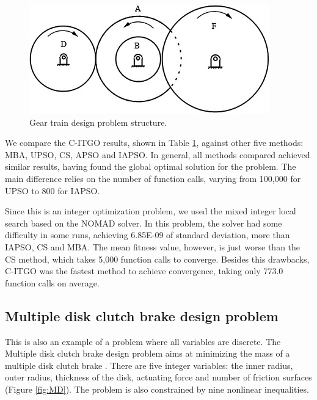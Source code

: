 \begin{figure}[h]
\begin{center}
\includegraphics[scale=0.6]{Imgs/GT.jpg}
\end{center}
\captionsetup{justification=centering}
\caption{Gear train design problem structure.}\label{fig:GT}
\end{figure}


We compare the C-ITGO results, shown in Table \ref{fig:GT}, against other five methods: MBA, UPSO, CS, APSO and IAPSO. In general, all methods compared achieved similar results, having found the global optimal solution for the problem. The main difference relies on the number of function calls, varying from 100,000 for UPSO to 800 for IAPSO.




Since this is an integer optimization problem, we used the mixed integer local search based on the NOMAD solver. In this problem, the solver had some difficulty in some runs, achieving 6.85E-09 of standard deviation, more than IAPSO, CS and MBA. The mean fitness value, however, is just worse than the CS method, which takes 5,000 function calls to converge. Besides this drawbacks, C-ITGO was the fastest method to achieve convergence, taking only 773.0 function calls on average.



\subsection{Multiple disk clutch brake design problem}

This is also an example of a problem where all variables are discrete. The Multiple disk clutch brake design problem aims at minimizing the mass of a multiple disk clutch brake \cite{MD}. There are five integer variables: the inner radius, outer radius, thickness of the disk, actuating force and number of friction surfaces (Figure \ref{fig:MD}). The problem is also constrained by nine nonlinear inequalities.

